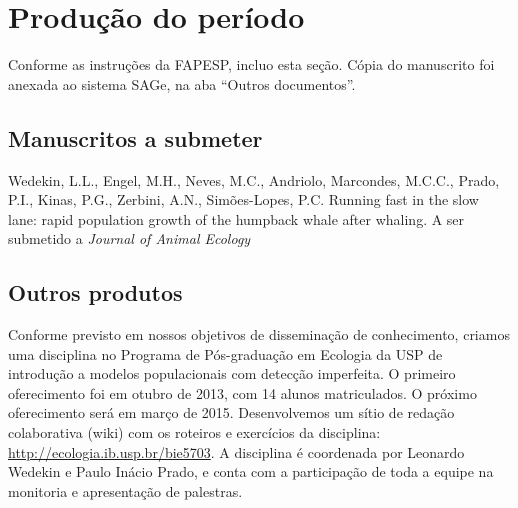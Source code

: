 \section{Produção do período} %
Conforme as instruções da FAPESP, incluo esta seção. 
Cópia do manuscrito foi anexada ao sistema SAGe, na aba ``Outros documentos''.

\subsection{Manuscritos a submeter}
\label{sec:manuscritos-submeter}
Wedekin, L.L., Engel, M.H., Neves, M.C., Andriolo, Marcondes, M.C.C., Prado, P.I., Kinas, P.G., Zerbini, A.N., 
Simões-Lopes, P.C. Running fast in the slow lane: rapid population growth of the humpback whale after whaling. A ser submetido a \emph{Journal of Animal Ecology}

\subsection{Outros produtos}
\label{sec:outros-produtos}

Conforme previsto em nossos objetivos de disseminação de conhecimento, 
criamos uma disciplina no Programa de Pós-graduação em Ecologia da USP de introdução
a modelos populacionais com detecção imperfeita. O primeiro oferecimento foi em otubro de 2013,
com 14 alunos matriculados. O próximo oferecimento será em março de 2015. 
Desenvolvemos um sítio de redação colaborativa (wiki) com os roteiros e exercícios da disciplina: 
\url{http://ecologia.ib.usp.br/bie5703}. A disciplina é coordenada por Leonardo Wedekin e Paulo Inácio Prado,
e conta com a participação de toda a equipe na monitoria e apresentação de palestras.
